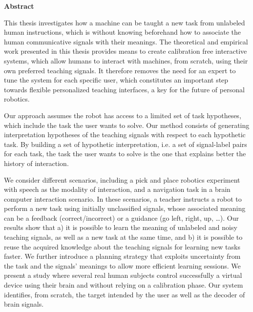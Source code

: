 
\begin{vcenterpage}

\begin{center}
{\LARGE\textbf{Abstract}} 
\end{center}


This thesis investigates how a machine can be taught a new task from unlabeled human instructions, which is without knowing beforehand how to associate the human communicative signals with their meanings. The theoretical and empirical work presented in this thesis provides means to create calibration free interactive systems, which allow humans to interact with machines, from scratch, using their own preferred teaching signals. It therefore removes the need for an expert to tune the system for each specific user, which constitutes an important step towards flexible personalized teaching interfaces, a key for the future of personal robotics.

Our approach assumes the robot has access to a limited set of task hypotheses, which include the task the user wants to solve. Our method consists of generating interpretation hypotheses of the teaching signals with respect to each hypothetic task. By building a set of hypothetic interpretation, i.e. a set of signal-label pairs for each task, the task the user wants to solve is the one that explains better the history of interaction.

We consider different scenarios, including a pick and place robotics experiment with speech as the modality of interaction, and a navigation task in a brain computer interaction scenario. In these scenarios, a teacher instructs a robot to perform a new task using initially unclassified signals, whose associated meaning can be a feedback (correct/incorrect) or a guidance (go left, right, up, \ldots). Our results show that a) it is possible to learn the meaning of unlabeled and noisy teaching signals, as well as a new task at the same time, and b) it is possible to reuse the acquired knowledge about the teaching signals for learning new tasks faster. We further introduce a planning strategy that exploits uncertainty from the task and the signals' meanings to allow more efficient learning sessions. We present a study where several real human subjects control successfully a virtual device using their brain and without relying on a calibration phase. Our system identifies, from scratch, the target intended by the user as well as the decoder of brain signals.


\end{vcenterpage}
